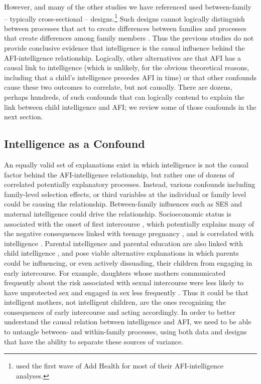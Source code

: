 \documentclass[a4paper,man,apacite,natbib,12pt,longtable]{apa6}\usepackage[]{graphicx}\usepackage[]{color}
\begin{document}
However, \citet{halpern2000smart} and many of the other studies we have referenced \citep[e.g.,][]{mathews2009predictors,miller1997timing,Paul2000} used between-family -- typically cross-sectional -- designs.\footnote{\citet{halpern2000smart} used the first wave of Add Health for most of their AFI-intelligence analyses.} Such designs cannot logically distinguish between processes that act to create differences between families and processes that create differences among family members \citep{Lahey2010,Rodgers2000}. Thus the previous studies do not provide conclusive evidence that intelligence is the causal influence behind the AFI-intelligence relationship. Logically, other alternatives are that AFI has a causal link to intelligence (which is unlikely, for the obvious theoretical reasons, including that a child's intelligence precedes AFI in time) or that other confounds cause these two outcomes to correlate, but not causally. There are dozens, perhaps hundreds, of such confounds that can logically contend to explain the link between child intelligence and AFI; we review some of those confounds in the next section.
%
\subsection{Intelligence as a Confound}
An equally valid set of explanations exist in which intelligence is not the causal factor behind the AFI-intelligence relationship, but rather one of dozens of correlated potentially explanatory processes. Instead, various confounds including family-level selection effects, or third variables at the individual or family level could be causing the relationship. Between-family influences such as SES and maternal intelligence could drive the relationship. Socioeconomic status is associated with the onset of first intercourse \citep{Lammers2000}, which potentially explains many of the negative consequences linked with teenage pregnancy \citep{geronimus1992socioeconomic}, and is correlated with intelligence \citep{murray1998income,Neisser1996,Strenze2007}. Parental intelligence and parental education are also linked with child intelligence \citep{Bouchard2004,devlin1997heritability,mercy1982familial}, and pose viable alternative explanations in which parents could be influencing, or even actively  dissuading, their children from engaging in early intercourse. For example, daughters whose mothers communicated frequently about the risk associated with sexual intercourse were less likely to have unprotected sex and engaged in sex less frequently \citep{hutchinson2003role}. Thus it could be that intelligent mothers, not intelligent children, are the ones recognizing the consequences of early intercourse and acting accordingly. In order to better understand the causal relation between intelligence and AFI, we need to be able to untangle between- and within-family processes, using both data and designs that have the ability to separate these sources of variance.
\end{document}
